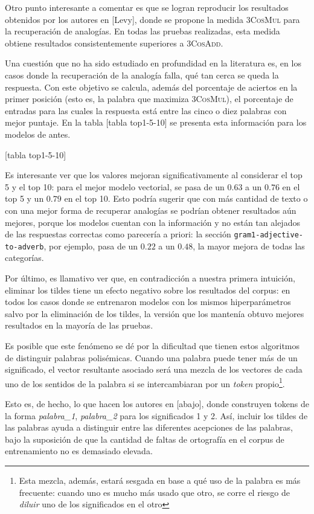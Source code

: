 Otro punto interesante a comentar es que se logran reproducir los resultados obtenidos por los
autores en [Levy], donde se propone la medida \textsc{3CosMul} para la recuperación de analogías. En
todas las pruebas realizadas, esta medida obtiene resultados consistentemente superiores a
\textsc{3CosAdd}.


Una cuestión que no ha sido estudiado en profundidad en la literatura es, en los casos donde la
recuperación de la analogía falla, qué tan cerca se queda la respuesta. Con este objetivo se
calcula, además del porcentaje de aciertos en la primer posición (esto es, la palabra que maximiza
\textsc{3CosMul}), el porcentaje de entradas para las cuales la respuesta está entre las cinco o
diez palabras con mejor puntaje. En la tabla [tabla top1-5-10] se presenta esta información para los
modelos de antes.

[tabla top1-5-10]

Es interesante ver que los valores mejoran significativamente al considerar el top 5 y el top 10:
para el mejor modelo vectorial, se pasa de un $0.63$ a un $0.76$ en el top 5 y un $0.79$ en el top
10. Esto podría sugerir que con más cantidad de texto o con una mejor forma de recuperar analogías
se podrían obtener resultados aún mejores, porque los modelos cuentan con la información y no están
tan alejados de las respuestas correctas como parecería a priori: la sección
\texttt{gram1-adjective-to-adverb}, por ejemplo, pasa de un $0.22$ a un $0.48$, la mayor mejora de
todas las categorías.


Por último, es llamativo ver que, en contradicción a nuestra primera intuición, eliminar los tildes
tiene un efecto negativo sobre los resultados del corpus: en todos los casos donde se entrenaron
modelos con los mismos hiperparámetros salvo por la eliminación de los tildes, la versión que los
mantenía obtuvo mejores resultados en la mayoría de las pruebas.

Es posible que este fenómeno se dé por la dificultad que tienen estos algoritmos de distinguir
palabras polisémicas. Cuando una palabra puede tener más de un significado, el vector resultante
asociado será una mezcla de los vectores de cada uno de los sentidos de la palabra si se
intercambiaran por un \textit{token} propio\footnote{Esta mezcla, además, estará sesgada en base a
qué uso de la palabra es más frecuente: cuando uno es mucho más usado que otro, se corre el riesgo
de \textit{diluir} uno de los significados en el otro}.

Esto es, de hecho, lo que hacen los autores en [abajo], donde construyen tokens de la forma
\textit{palabra\_1}, \textit{palabra\_2} para los significados 1 y 2. Así, incluir los tildes de las
palabras ayuda a distinguir entre las diferentes acepciones de las palabras, bajo la suposición de
que la cantidad de faltas de ortografía en el corpus de entrenamiento no es demasiado elevada.

